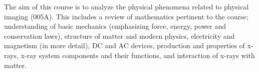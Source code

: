{The aim of this course is to analyze the physical phenomena related to physical imaging (005A).  This includes a review of mathematics pertinent to the course; understanding of basic mechanics (emphasizing force, energy, power and conservation laws), structure of matter and modern physics, electricity and magnetism (in more detail), DC and AC devices, production and properties of x-rays, x-ray system components and their functions, and interaction of x-rays with matter.}
